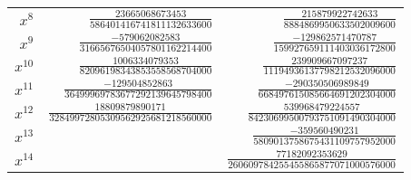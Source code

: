 \begin{longtable}{r r r}
	$x^{8}$ & $\frac{23665068673453}{586401416741811132633600}$ & $\frac{215879922742633}{8884869950633502009600}$\\
	$x^{9}$ & $\frac{-579062082583}{31665676504057801162214400}$ & $\frac{-129862571470787}{159927659111403036172800}$\\
	$x^{10}$ & $\frac{1006334079353}{82096198343853558568704000}$ & $\frac{239909667097237}{11194936137798212532096000}$\\
	$x^{11}$ & $\frac{-129504852863}{36499969783677292139645798400}$ & $\frac{-290350506989849}{668497615085664691202304000}$\\
	$x^{12}$ & $\frac{18809879890171}{32849972805309562925681218560000}$ & $\frac{539968479224557}{84230699500793751091490304000}$\\
	$x^{13}$ & & $\frac{-359560490231}{5809013758675431109757952000}$\\
	$x^{14}$ & & $\frac{77182092353629}{260609784255455865877071000576000}$
\end{longtable}

